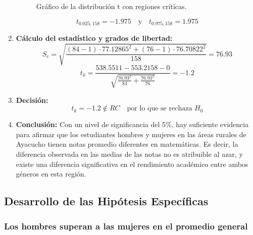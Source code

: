 \documentclass[
]{article}
\begin{document}
\begin{enumerate}
\begin{figure}[ht]
        \caption{Gráfico de la distribución t con regiones críticas.}
    \end{figure}
    \[
    t_{0.025, 158} = -1.975 \quad \text{y} \quad t_{0.975, 158} = 1.975
    \]
    \item \textbf{Cálculo del estadístico y grados de libertad:}
    \[
    S_c = \sqrt{\frac{(84 - 1) \cdot 77.12865^2 + (76 - 1) \cdot 76.70822^2}{158}} = 76.93
    \]
    \[
    t_k = \frac{538.5511 - 553.2158 - 0}{\sqrt{\frac{76.93^2}{84} + \frac{76.93^2}{76}}} = -1.2
    \]
    \item \textbf{Decisión:}
    \[
    t_k = -1.2 \notin RC \quad \text{por lo que se rechaza } H_0
    \]

  \item \textbf{Conclusión:}
    Con un nivel de significancia del 5\%, hay suficiente evidencia para afirmar que los estudiantes hombres y mujeres en las áreas rurales de Ayacucho tienen notas promedio diferentes en matemáticas. Es decir, la diferencia observada en las medias de las notas no es atribuible al azar, y existe una diferencia significativa en el rendimiento académico entre ambos géneros en esta región.
    
\end{enumerate}

\subsection*{Desarrollo de las Hipótesis
Específicas}\label{desarrollo-de-las-hipuxf3tesis-especuxedficas}

\subsubsection*{Los hombres superan a las mujeres en el promedio
general}\label{los-hombres-superan-a-las-mujeres-en-el-promedio-general}
\end{document}
